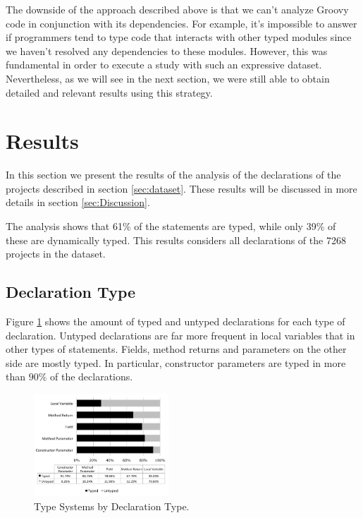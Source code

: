 \documentclass[preprint]{sigplanconf}
\begin{document}
The downside of the approach described above is that we can't analyze Groovy code in conjunction with its dependencies. 
For example, it's impossible to answer if programmers tend to type code that interacts with other typed modules since we haven't resolved any dependencies to these modules.
However, this was fundamental in order to execute a study with such an expressive dataset.
Nevertheless, as we will see in the next section, we were still able to obtain detailed and relevant results using this strategy.











%
%
\section{Results\label{sec:results}}

In this section we present the results of the analysis of the declarations of the projects described in section \ref{sec:dataset}. 
These results will be discussed in more details in section \ref{sec:Discussion}.

The analysis shows that 61\% of the statements are typed, while only 39\% of these are dynamically typed. This results considers all declarations of the 7268 projects in the dataset.

\subsection{Declaration Type\label{sub:declaration-type-results}}
Figure \ref{fig:tipo_declaracao} shows the amount of typed and untyped declarations for each type of declaration. 
Untyped declarations are far more frequent in local variables that in other types of statements.
Fields, method returns and parameters on the other side are mostly typed. In particular, constructor parameters are typed in more than $90\%$ of the declarations.

\begin{figure}[ht]
\centering 
\includegraphics[width=0.45\textwidth]{images/type} 
\caption{Type Systems by Declaration Type.}
\label{fig:tipo_declaracao} 
\end{figure}
\end{document}
